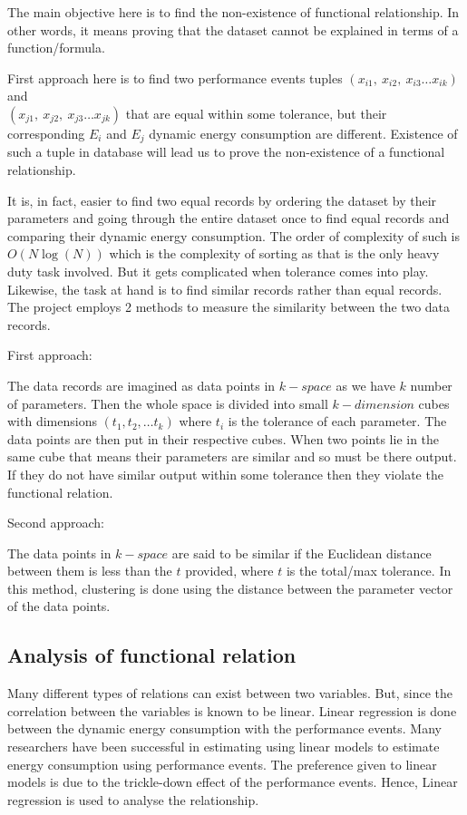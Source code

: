 The main objective here is to find the non-existence of functional relationship. In other words, it means proving that the dataset cannot be explained in terms of a function/formula.

First approach here is to find two performance events tuples \((x_{i1},\ x_{i2},\ x_{i3} \ldots x_{ik})\) and \\ \((x_{j1},\ x_{j2},\ x_{j3} \ldots x_{jk})\) that are equal within some tolerance, but their corresponding \(E_i\) and \(E_j\) dynamic energy consumption are different. Existence of such a tuple in database will lead us to prove the non-existence of a functional relationship.

It is, in fact, easier to find two equal records by ordering the dataset by their parameters and going through the entire dataset once to find equal records and comparing their dynamic energy consumption. The order of complexity of such is \(O(N \log(N))\) which is the complexity of sorting as that is the only heavy duty task involved. But it gets complicated when tolerance comes into play. Likewise, the task at hand is to find similar records rather than equal records. The project employs 2 methods to measure the similarity between the two data records.

First approach:

The data records are imagined as data points in \(k-space\) as we have \(k\) number of parameters. Then the whole space is divided into small \(k-dimension\) cubes with dimensions \((t_1, t_2, \ldots t_k)\) where \(t_i\) is the tolerance of each parameter. The data points are then put in their respective cubes. When two points lie in the same cube that means their parameters are similar and so must be there output. If they do not have similar output within some tolerance then they violate the functional relation.

Second approach:

The data points in \(k-space\) are said to be similar if the Euclidean distance between them is less than the \(t\) provided, where \(t\) is the total/max tolerance. In this method, clustering is done using the distance between the parameter vector of the data points.

\subsection{Analysis of functional relation}

Many different types of relations can exist between two variables. But, since the correlation between the variables is known to be linear. Linear regression is done between the dynamic energy consumption with the performance events. Many researchers have been successful in estimating using linear models to estimate energy consumption using performance events.\cite{o2017survey} The preference given to linear models is due to the trickle-down effect of the performance events.\cite{bircher2007complete} Hence, Linear regression is used to analyse the relationship.

